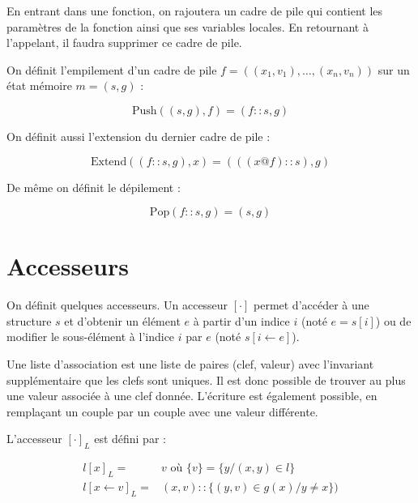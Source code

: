 En entrant dans une fonction, on rajoutera un cadre de pile qui contient les
paramètres de la fonction ainsi que ses variables locales. En retournant à
l'appelant, il faudra supprimer ce cadre de pile.

\begin{definition}

  On définit l'empilement d'un cadre de pile $f = ((x_1, v_1), …, (x_n, v_n))$
  sur un état mémoire $m = (s, g)$ :

  \[
    \mathrm{Push}((s, g), f) = (f::s, g)
  \]

  On définit aussi l'extension du dernier cadre de pile :

  \[
    \mathrm{Extend}((f::s, g), x) = (((x @ f) :: s), g)
  \]

  De même on définit le dépilement :

  \[
    \mathrm{Pop}(f::s, g) = (s, g)
  \]

\end{definition}

\section{Accesseurs}

On définit quelques accesseurs. Un accesseur $ [ \cdot ] $ permet d'accéder à
une structure $s$ et d'obtenir un élément $e$ à partir d'un indice $i$ (noté $e
= s [ i ]$) ou de modifier le sous-élément à l'indice $i$ par $e$ (noté $ s [ i
← e ] $).

\begin{definition}

  Une liste d'association est une liste de paires (clef, valeur) avec
  l'invariant supplémentaire que les clefs sont uniques. Il est donc possible de
  trouver au plus une valeur associée à une clef donnée. L'écriture est
  également possible, en remplaçant un couple par un couple avec une valeur
  différente.

  L'accesseur $[\cdot]_L$ est défini par :

  \begin{align*}
    l[x]_L     = & v \mbox{ où } \{v\} = \{y / (x, y) ∈ l\} \\
    l[x ← v]_L = & (x, v) :: \{ (y, v) ∈ g(x) / y ≠ x \})
  \end{align*}

\end{definition}

